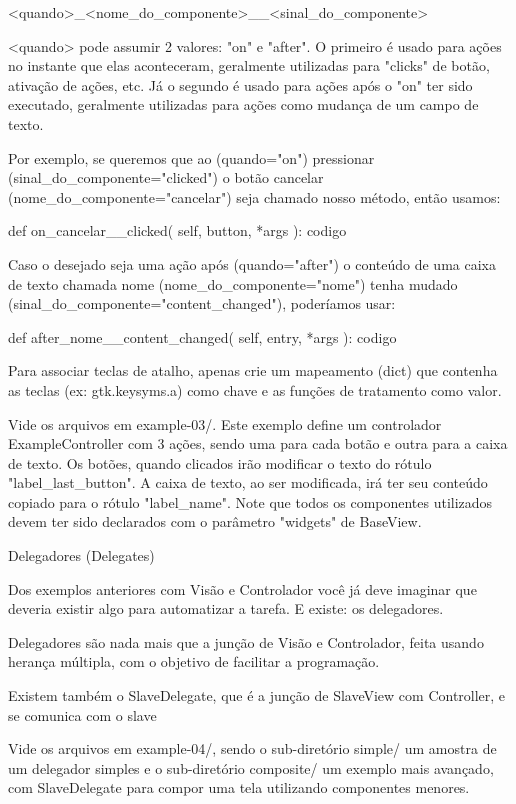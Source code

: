    <quando>_<nome_do_componente>__<sinal_do_componente>

<quando> pode assumir 2 valores: "on" e "after". O primeiro é usado
para ações no instante que elas aconteceram, geralmente utilizadas
para "clicks" de botão, ativação de ações, etc. Já o segundo é usado
para ações após o "on" ter sido executado, geralmente utilizadas para
ações como mudança de um campo de texto.

Por exemplo, se queremos que ao (quando="on") pressionar
(sinal_do_componente="clicked") o botão cancelar
(nome_do_componente="cancelar") seja chamado nosso método, então
usamos:

   def on_cancelar__clicked( self, button, *args ):
       codigo

Caso o desejado seja uma ação após (quando="after") o conteúdo de uma
caixa de texto chamada nome (nome_do_componente="nome") tenha mudado
(sinal_do_componente="content_changed"), poderíamos usar:

   def after_nome__content_changed( self, entry, *args ):
       codigo

Para associar teclas de atalho, apenas crie um mapeamento (dict) que
contenha as teclas  (ex: gtk.keysyms.a) como chave e as funções de
tratamento como valor.

Vide os arquivos em example-03/. Este exemplo define um controlador
ExampleController com 3 ações, sendo uma para cada botão e outra para
a caixa de texto. Os botões, quando clicados irão modificar o texto do
rótulo "label_last_button". A caixa de texto, ao ser modificada, irá
ter seu conteúdo copiado para o rótulo "label_name". Note que todos os
componentes utilizados devem ter sido declarados com o parâmetro
"widgets" de BaseView.


Delegadores (Delegates)
~~~~~~~~~~~~~~~~~~~~~~~

Dos exemplos anteriores com Visão e Controlador você já deve imaginar
que deveria existir algo para automatizar a tarefa. E existe: os
delegadores.

Delegadores são nada mais que a junção de Visão e Controlador, feita
usando herança múltipla, com o objetivo de facilitar a programação.

Existem também o SlaveDelegate, que é a junção de SlaveView com
Controller, e se comunica com o slave

Vide os arquivos em example-04/, sendo o sub-diretório simple/ um
amostra de um delegador simples e o sub-diretório composite/ um
exemplo mais avançado, com SlaveDelegate para compor uma tela
utilizando componentes menores.

